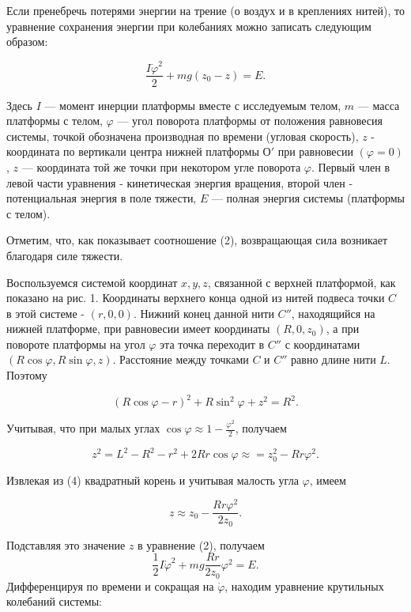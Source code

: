 Если пренебречь потерями энергии на трение (о воздух и в креплениях нитей), то уравнение сохранения энергии при колебаниях можно записать следующим образом:

\begin{equation}
    \frac{I\dot{\varphi}^2}{2} + mg \left(z_0 - z\right) = E.
\end{equation}

Здесь $I$ — момент инерции платформы вместе с исследуемым телом, $m$ —
масса платформы с телом, $\varphi$ — угол поворота платформы от
положения равновесия системы, точкой обозначена производная по времени
(угловая скорость), $z$ - координата по вертикали центра нижней
платформы $О'$ при равновесии $\left(\varphi = 0\right)$, $z$ —
координата той же точки при некотором угле поворота $\varphi$. Первый
член в левой части уравнения - кинетическая энергия вращения, второй
член - потенциальная энергия в поле тяжести, $E$ — полная энергия
системы (платформы с телом).

Отметим, что, как показывает соотношение (2), возвращающая сила
возникает благодаря силе тяжести.

Воспользуемся системой координат $x, y, z$, связанной с верхней
платформой, как показано на рис. 1. Координаты верхнего конца одной из
нитей подвеса точки $C$ в этой системе - $\left(r, 0,0 \right)$. Нижний
конец данной нити $C''$, находящийся на нижней платформе, при равновесии
имеет координаты $(R, 0, z_0)$, а при повороте платформы на угол
$\varphi$ эта точка переходит в $C''$ с координатами
$(R\cos{\varphi}, R\sin{\varphi}, z)$. Расстояние между точками $C$ и
$C''$ равно длине нити $L$. Поэтому

\begin{equation}
    \left(R\cos\varphi - r\right)^2 + R\sin^2\varphi + z^2 = R^2.
\end{equation}

Учитывая, что при малых углах
$\cos\varphi \approx 1 - \frac{\varphi^2}{2}$, получаем

\begin{equation}
    z^2 = L^2 - R^2 - r^2 + 2Rr\cos \varphi \approx = z_0^2 - Rr\varphi^2.
\end{equation}

Извлекая из (4) квадратный корень и учитывая малость угла $\varphi$, имеем

\begin{equation}
    z \approx z_0 -\frac{Rr\varphi^2}{2z_0}.
\end{equation}

Подставляя это значение $z$ в уравнение (2), получаем
\begin{equation}
    \frac 12I\dot{\varphi}^2+mg\frac{Rr}{2z_0}\varphi^2 = E.
\end{equation}
Дифференцируя по времени и сокращая на $\dot{\varphi}$, находим уравнение крутильных колебаний системы:

